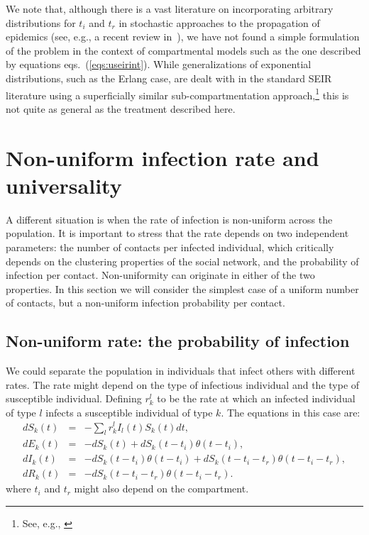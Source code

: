 \documentclass[a4paper,oneside,11pt]{article}
\begin{document}
We note that, although there is a vast literature on incorporating arbitrary distributions for $t_i$ and $t_r$
in stochastic approaches to the propagation of epidemics (see, e.g., a recent review in~\cite{stocrev}), we have not found {a} simple formulation  of the problem in the context of compartmental models such as the one described by equations eqs.~(\ref{eqs:useirint}).
While generalizations of exponential distributions, such as the Erlang case, are dealt with
in the standard SEIR literature using a superficially similar sub-compartmentation approach,\footnote{See, e.g.,
\cite{Lloyd2001,Lloyd2001b,Wearing2005,Conlan2009,Krylova2013}} this is not quite as general
as the treatment described here.


\section{Non-uniform infection rate and universality }
\label{sec:r}

A different situation is when the rate of infection is non-uniform across the population. It is important to stress that the rate depends on two independent parameters: the number of contacts per infected individual, which critically depends on the clustering properties of the social network,  and the probability of infection per contact. Non-uniformity can originate in either of the two properties. In this section we will consider the simplest case of a uniform number of contacts, but a non-uniform infection probability per contact.

\subsection{Non-uniform rate: the probability of infection}
\label{sec:prob}

We could separate the population in individuals that infect others with different rates. The rate might depend on the type of infectious individual and the type of susceptible individual. Defining $r^{l}_{k}$ to be the rate at which an infected individual of type $l$ infects a susceptible individual of type $k$. The equations in this case are:
\begin{eqnarray}
d S_k(t) &=& - \sum_l r^l_{k}  I_l(t) S_k(t) dt, \nonumber\\
d E_k(t) &=& -d S_k(t) + d S_k(t-t_i) \theta(t-t_i) ,\nonumber\\
d I_k(t) &=& -d S_k(t-t_i) \theta(t-t_i)+ d S_k(t-t_i-t_r) \theta(t-t_i-t_r),\nonumber\\
d R_k(t) &=& - d S_k(t - t_i - t_r) \theta(t-t_i-t_r).\nonumber
\end{eqnarray}
where $t_i$ and $t_r$ might also depend on the compartment.
\end{document}
